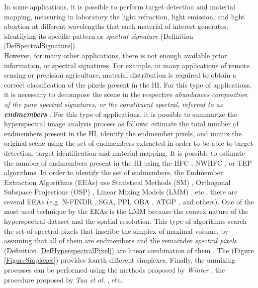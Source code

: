 \documentclass[11pt, oneside]{Thesis} %
\begin{document}
In some applications, it is possible to perform target detection 
and material mapping, measuring in laboratory the light refraction, light emission, 
and light abortion at different wavelengths that each material of interest generates, 
identifying its specific pattern or \emph{spectral signature} (Definition 
\ref{DefSpectralSignature}). \\

However, for many other applications, there is not enough available prior 
information, or spectral signatures. For example, in many applications of remote sensing or 
precision agriculture, material distribution is required to obtain a correct 
classification of the pixels present in the HI. For this type of applications, it is necessary 
to decompose the scene in the respective \emph{abundances composition of the pure spectral 
signatures, or the constituent spectral, referred to as \textbf{endmembers}} \cite{Alina}. 
For this type of applications, it is possible to summarize the hyperspectral image analysis 
process as follows: estimate the total number of endmembers present in the HI, identify the 
endmember pixels, and unmix the original scene using the set of endmembers extracted in 
order to be able to target detection, target identification and material mapping. It is 
possible to estimate the number of endmembers present in the HI using the 
HFC \cite{HFC-NWHFC}, NWHFC \cite{HFC-NWHFC}, or TEP \cite{EIGENENERGY} algorithms. 
In order to identify the set of endmembers, 
the Endmember Extraction Algorithms (EEAs) use Statistical Methods (SM) \cite{Dimitris}, Orthogonal 
Subspace Projections (OSP) \cite{EIGENENERGY}, Linear Mixing Models (LMM) \cite{NFINDR}, etc., 
there are several EEAs (e.g. N-FINDR \cite{NFINDR}, SGA\cite{SGA}, PPI\cite{PPI}, OBA \cite{OBA}, 
ATGP \cite{ChangBig2013}, and others). One of the most used technique by the EEAs is the LMM 
because the convex nature of the hyperspectral dataset 
and the spatial resolution. This type of algorithms search the set of spectral pixels that inscribe 
the simplex \cite{PeterLax} of maximal volume, by assuming that all of them are endmembers and the 
remainder \emph{spectral pixels} (Definition \ref{DefHyperspectralPixel}) are linear combination of them \cite{NFINDR}. 
The (Figure \ref{FigureSinplexes}) 
provides fourth different simplexes. Finally, 
the unmixing processes can be performed using the methods proposed by \emph{Winter} \cite{NFINDR}, 
the procedure proposed by \emph{Tao et al.} \cite{OBA}, etc. \\
\end{document}
